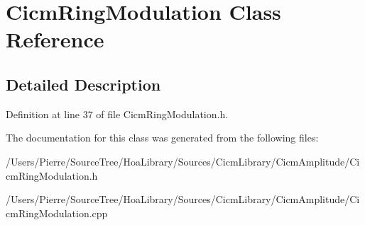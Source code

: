 \hypertarget{class_cicm_ring_modulation}{\section{Cicm\-Ring\-Modulation Class Reference}
\label{class_cicm_ring_modulation}
}


\subsection{Detailed Description}


Definition at line 37 of file Cicm\-Ring\-Modulation.\-h.



The documentation for this class was generated from the following files\-:\begin{DoxyCompactItemize}
\item 
/\-Users/\-Pierre/\-Source\-Tree/\-Hoa\-Library/\-Sources/\-Cicm\-Library/\-Cicm\-Amplitude/Cicm\-Ring\-Modulation.\-h\item 
/\-Users/\-Pierre/\-Source\-Tree/\-Hoa\-Library/\-Sources/\-Cicm\-Library/\-Cicm\-Amplitude/Cicm\-Ring\-Modulation.\-cpp\end{DoxyCompactItemize}
